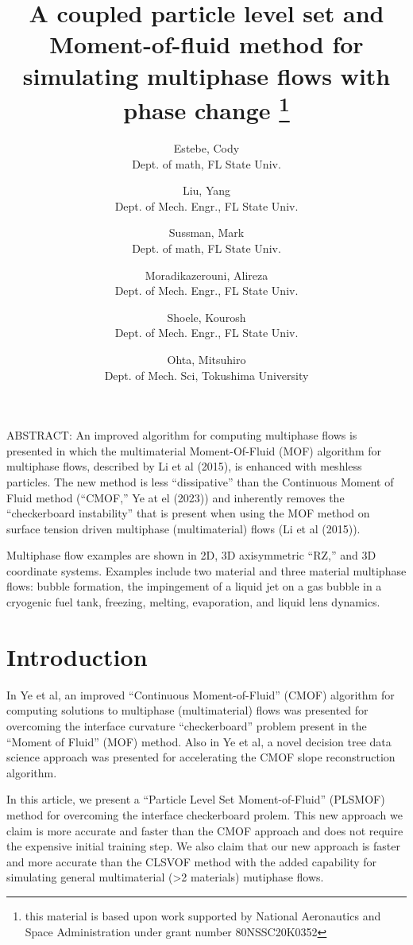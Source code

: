 \documentclass[]{article}
\title{A coupled particle level set and Moment-of-fluid method 
  for simulating multiphase flows with phase change
  \thanks{this material is based upon work supported by National
   Aeronautics and Space Administration under grant number
   80NSSC20K0352}}
\author{
  Estebe, Cody \\
  Dept. of math, FL State Univ. 
  \and
  Liu, Yang \\
  Dept. of Mech. Engr., FL State Univ.
  \and
  Sussman, Mark \\
  Dept. of math, FL State Univ. 
  \and
  Moradikazerouni, Alireza \\
  Dept. of Mech. Engr., FL State Univ.
  \and
  Shoele, Kourosh  \\
  Dept. of Mech. Engr., FL State Univ.
  \and
  Ohta, Mitsuhiro \\
  Dept. of Mech. Sci, Tokushima University 
}
\begin{document}
\maketitle

ABSTRACT:
An improved algorithm for computing multiphase flows is presented in 
which the multimaterial Moment-Of-Fluid (MOF) algorithm for multiphase flows, 
described by Li et al (2015), is enhanced with 
meshless particles.  The new method is less ``dissipative'' than the 
Continuous Moment of Fluid method (``CMOF,'' Ye at el (2023)) and inherently 
removes the ``checkerboard instability'' that is present when using the 
MOF method on surface tension driven multiphase (multimaterial) 
flows (Li et al (2015)).

Multiphase flow examples are shown in 2D, 3D axisymmetric ``RZ,'' and 
3D coordinate systems.  Examples include two material and three 
material multiphase flows: bubble formation, the impingement of a 
liquid jet on a gas bubble in a cryogenic fuel tank, freezing, melting,
evaporation, and liquid lens dynamics.
\linenumbers
\section{Introduction}
In Ye et al\cite{YeEstebe...},
an improved ``Continuous Moment-of-Fluid'' (CMOF) algorithm
for computing solutions to multiphase (multimaterial) flows was
presented for overcoming the interface curvature ``checkerboard'' problem
present in the ``Moment of Fluid'' (MOF) \cite{MOF} method.  
Also in Ye et al\cite{YeEstebe...}, a novel decision tree data science 
approach was presented for accelerating the CMOF slope reconstruction 
algorithm.   

In this article, we present a ``Particle Level Set Moment-of-Fluid'' (PLSMOF)
method for overcoming the interface checkerboard prolem.  This new approach
we claim is more accurate and faster than the CMOF approach and 
does not require the expensive initial training step.  We also claim that
our new approach is faster and more accurate than the CLSVOF 
method\cite{SusPuckett} with the added capability for simulating
general multimaterial (>2 materials) mutiphase flows.
\end{document}
